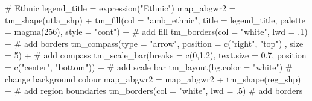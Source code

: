 \documentclass[
  letterpaper,
  krantz2]{style/krantz}
\newenvironment{Shaded}{\begin{snugshade}}{\end{snugshade}}
\newcommand{\AttributeTok}[1]{\textcolor[rgb]{0.40,0.45,0.13}{#1}}
\newcommand{\CommentTok}[1]{\textcolor[rgb]{0.37,0.37,0.37}{#1}}
\newcommand{\DecValTok}[1]{\textcolor[rgb]{0.68,0.00,0.00}{#1}}
\newcommand{\FloatTok}[1]{\textcolor[rgb]{0.68,0.00,0.00}{#1}}
\newcommand{\FunctionTok}[1]{\textcolor[rgb]{0.28,0.35,0.67}{#1}}
\newcommand{\NormalTok}[1]{\textcolor[rgb]{0.00,0.23,0.31}{#1}}
\newcommand{\OtherTok}[1]{\textcolor[rgb]{0.00,0.23,0.31}{#1}}
\newcommand{\SpecialCharTok}[1]{\textcolor[rgb]{0.37,0.37,0.37}{#1}}
\newcommand{\StringTok}[1]{\textcolor[rgb]{0.13,0.47,0.30}{#1}}
\begin{document}
\begin{Shaded}
\begin{Highlighting}[]
  \CommentTok{\# Ethnic}
\NormalTok{legend\_title }\OtherTok{=} \FunctionTok{expression}\NormalTok{(}\StringTok{"Ethnic"}\NormalTok{)}
\NormalTok{map\_abgwr2 }\OtherTok{=} \FunctionTok{tm\_shape}\NormalTok{(utla\_shp) }\SpecialCharTok{+}
  \FunctionTok{tm\_fill}\NormalTok{(}\AttributeTok{col =} \StringTok{"amb\_ethnic"}\NormalTok{, }\AttributeTok{title =}\NormalTok{ legend\_title, }\AttributeTok{palette =} \FunctionTok{magma}\NormalTok{(}\DecValTok{256}\NormalTok{), }\AttributeTok{style =} \StringTok{"cont"}\NormalTok{) }\SpecialCharTok{+} \CommentTok{\# add fill}
  \FunctionTok{tm\_borders}\NormalTok{(}\AttributeTok{col =} \StringTok{"white"}\NormalTok{, }\AttributeTok{lwd =}\NormalTok{ .}\DecValTok{1}\NormalTok{)  }\SpecialCharTok{+} \CommentTok{\# add borders}
  \FunctionTok{tm\_compass}\NormalTok{(}\AttributeTok{type =} \StringTok{"arrow"}\NormalTok{, }\AttributeTok{position =} \FunctionTok{c}\NormalTok{(}\StringTok{"right"}\NormalTok{, }\StringTok{"top"}\NormalTok{) , }\AttributeTok{size =} \DecValTok{5}\NormalTok{) }\SpecialCharTok{+} \CommentTok{\# add compass}
  \FunctionTok{tm\_scale\_bar}\NormalTok{(}\AttributeTok{breaks =} \FunctionTok{c}\NormalTok{(}\DecValTok{0}\NormalTok{,}\DecValTok{1}\NormalTok{,}\DecValTok{2}\NormalTok{), }\AttributeTok{text.size =} \FloatTok{0.7}\NormalTok{, }\AttributeTok{position =}  \FunctionTok{c}\NormalTok{(}\StringTok{"center"}\NormalTok{, }\StringTok{"bottom"}\NormalTok{)) }\SpecialCharTok{+} \CommentTok{\# add scale bar}
  \FunctionTok{tm\_layout}\NormalTok{(}\AttributeTok{bg.color =} \StringTok{"white"}\NormalTok{) }\CommentTok{\# change background colour}
\NormalTok{map\_abgwr2 }\OtherTok{=}\NormalTok{ map\_abgwr2 }\SpecialCharTok{+} \FunctionTok{tm\_shape}\NormalTok{(reg\_shp) }\SpecialCharTok{+} \CommentTok{\# add region boundaries}
  \FunctionTok{tm\_borders}\NormalTok{(}\AttributeTok{col =} \StringTok{"white"}\NormalTok{, }\AttributeTok{lwd =}\NormalTok{ .}\DecValTok{5}\NormalTok{) }\CommentTok{\# add borders}


\end{Highlighting}
\end{Shaded}
\end{document}
